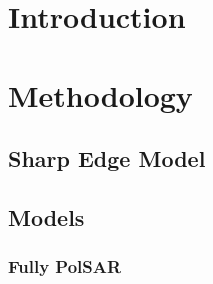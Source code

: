 \documentclass[remotesensing,article,submit,moreauthors,pdftex]{Definitions/mdpi}
\begin{document}



\section{Introduction}
\cite{lee}
\section{Methodology}
\subsection{Sharp Edge Model}
\subsection{Models}
\subsubsection{Fully PolSAR}
\end{document}
